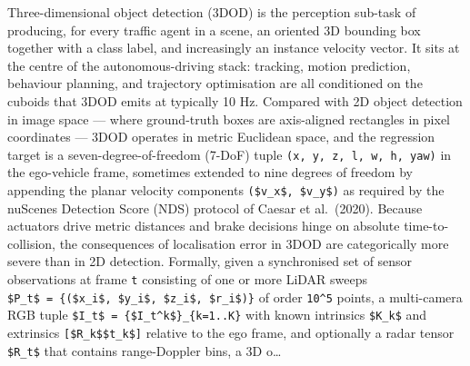 Three-dimensional object detection (3DOD) is the perception sub-task of producing, for every traffic agent in a scene, an oriented 3D bounding box together with a class label, and increasingly an instance velocity vector. It sits at the centre of the autonomous-driving stack: tracking, motion prediction, behaviour planning, and trajectory optimisation are all conditioned on the cuboids that 3DOD emits at typically 10 Hz. Compared with 2D object detection in image space --- where ground-truth boxes are axis-aligned rectangles in pixel coordinates --- 3DOD operates in metric Euclidean space, and the regression target is a seven-degree-of-freedom (7-DoF) tuple \texttt{(x,\ y,\ z,\ l,\ w,\ h,\ yaw)} in the ego-vehicle frame, sometimes extended to nine degrees of freedom by appending the planar velocity components \texttt{(\$v\_x\$,\ \$v\_y\$)} as required by the nuScenes Detection Score (NDS) protocol of Caesar et al.~(2020). Because actuators drive metric distances and brake decisions hinge on absolute time-to-collision, the consequences of localisation error in 3DOD are categorically more severe than in 2D detection. Formally, given a synchronised set of sensor observations at frame \texttt{t} consisting of one or more LiDAR sweeps \texttt{\$P\_t\$\ =\ \{(\$x\_i\$,\ \$y\_i\$,\ \$z\_i\$,\ \$r\_i\$)\}} of order \texttt{10\^{}5} points, a multi-camera RGB tuple \texttt{\$I\_t\$\ =\ \{\$I\_t\^{}k\$\}\_\{k=1..K\}} with known intrinsics \texttt{\$K\_k\$} and extrinsics \texttt{{[}\$R\_k\$\textbar{}\$t\_k\${]}} relative to the ego frame, and optionally a radar tensor \texttt{\$R\_t\$} that contains range-Doppler bins, a 3D o\ldots{}

